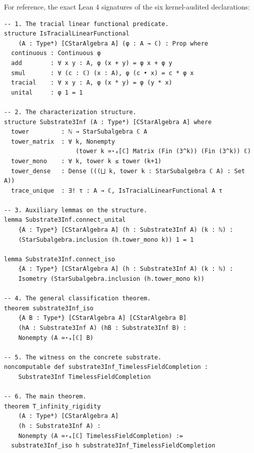 \documentclass[11pt,a4paper]{article}
\theoremstyle{plain}
\theoremstyle{definition}
\begin{document}
For reference, the exact Lean 4 signatures of the six kernel-audited declarations:

\begin{lstlisting}
-- 1. The tracial linear functional predicate.
structure IsTracialLinearFunctional
    (A : Type*) [CStarAlgebra A] (φ : A → ℂ) : Prop where
  continuous : Continuous φ
  add        : ∀ x y : A, φ (x + y) = φ x + φ y
  smul       : ∀ (c : ℂ) (x : A), φ (c • x) = c * φ x
  tracial    : ∀ x y : A, φ (x * y) = φ (y * x)
  unital     : φ 1 = 1

-- 2. The characterization structure.
structure Substrate3Inf (A : Type*) [CStarAlgebra A] where
  tower         : ℕ → StarSubalgebra ℂ A
  tower_matrix  : ∀ k, Nonempty
                    (tower k ≃⋆ₐ[ℂ] Matrix (Fin (3^k)) (Fin (3^k)) ℂ)
  tower_mono    : ∀ k, tower k ≤ tower (k+1)
  tower_dense   : Dense (((⨆ k, tower k : StarSubalgebra ℂ A) : Set A))
  trace_unique  : ∃! τ : A → ℂ, IsTracialLinearFunctional A τ

-- 3. Auxiliary lemmas on the structure.
lemma Substrate3Inf.connect_unital
    {A : Type*} [CStarAlgebra A] (h : Substrate3Inf A) (k : ℕ) :
    (StarSubalgebra.inclusion (h.tower_mono k)) 1 = 1

lemma Substrate3Inf.connect_iso
    {A : Type*} [CStarAlgebra A] (h : Substrate3Inf A) (k : ℕ) :
    Isometry (StarSubalgebra.inclusion (h.tower_mono k))

-- 4. The general classification theorem.
theorem substrate3Inf_iso
    {A B : Type*} [CStarAlgebra A] [CStarAlgebra B]
    (hA : Substrate3Inf A) (hB : Substrate3Inf B) :
    Nonempty (A ≃⋆ₐ[ℂ] B)

-- 5. The witness on the concrete substrate.
noncomputable def substrate3Inf_TimelessFieldCompletion :
    Substrate3Inf TimelessFieldCompletion

-- 6. The main theorem.
theorem T_infinity_rigidity
    (A : Type*) [CStarAlgebra A]
    (h : Substrate3Inf A) :
    Nonempty (A ≃⋆ₐ[ℂ] TimelessFieldCompletion) :=
  substrate3Inf_iso h substrate3Inf_TimelessFieldCompletion
\end{lstlisting}
\end{document}
